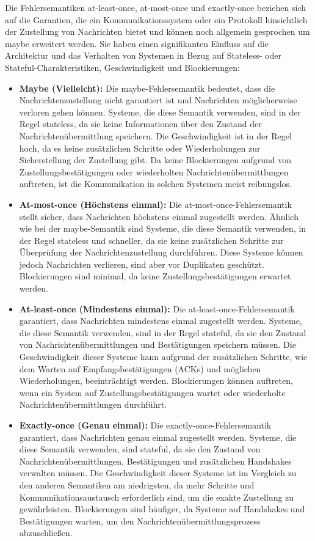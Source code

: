 \documentclass[../vs-script-first-v01.tex]{subfiles}
\begin{document}
Die Fehlersemantiken at-least-once, at-most-once und exactly-once beziehen sich auf die Garantien, die ein Kommunikationssystem oder ein Protokoll hinsichtlich der Zustellung von Nachrichten bietet und können noch allgemein gesprochen um maybe erweitert werden. Sie haben einen signifikanten Einfluss auf die Architektur und das Verhalten von Systemen in Bezug auf Stateless- oder Stateful-Charakteristiken, Geschwindigkeit und Blockierungen:
\begin{itemize}
\item  \textbf{Maybe (Vielleicht):} Die maybe-Fehlersemantik bedeutet, dass die Nachrichtenzustellung nicht garantiert ist und Nachrichten möglicherweise verloren gehen können. Systeme, die diese Semantik verwenden, sind in der Regel stateless, da sie keine Informationen über den Zustand der Nachrichtenübermittlung speichern. Die Geschwindigkeit ist in der Regel hoch, da es keine zusätzlichen Schritte oder Wiederholungen zur Sicherstellung der Zustellung gibt. Da keine Blockierungen aufgrund von Zustellungsbestätigungen oder wiederholten Nachrichtenübermittlungen auftreten, ist die Kommunikation in solchen Systemen meist reibungslos.
\item \textbf{At-most-once (Höchstens einmal):} Die at-most-once-Fehlersemantik stellt sicher, dass Nachrichten höchstens einmal zugestellt werden. Ähnlich wie bei der maybe-Semantik sind Systeme, die diese Semantik verwenden, in der Regel stateless und schneller, da sie keine zusätzlichen Schritte zur Überprüfung der Nachrichtenzustellung durchführen. Diese Systeme können jedoch Nachrichten verlieren, sind aber vor Duplikaten geschützt. Blockierungen sind minimal, da keine Zustellungsbestätigungen erwartet werden.
\item \textbf{At-least-once (Mindestens einmal):} Die at-least-once-Fehlersemantik garantiert, dass Nachrichten mindestens einmal zugestellt werden. Systeme, die diese Semantik verwenden, sind in der Regel stateful, da sie den Zustand von Nachrichtenübermittlungen und Bestätigungen speichern müssen. Die Geschwindigkeit dieser Systeme kann aufgrund der zusätzlichen Schritte, wie dem Warten auf Empfangsbestätigungen (ACKs) und möglichen Wiederholungen, beeinträchtigt werden. Blockierungen können auftreten, wenn ein System auf Zustellungsbestätigungen wartet oder wiederholte Nachrichtenübermittlungen durchführt.
\item \textbf{Exactly-once (Genau einmal):} Die exactly-once-Fehlersemantik garantiert, dass Nachrichten genau einmal zugestellt werden. Systeme, die diese Semantik verwenden, sind stateful, da sie den Zustand von Nachrichtenübermittlungen, Bestätigungen und zusätzlichen Handshakes verwalten müssen. Die Geschwindigkeit dieser Systeme ist im Vergleich zu den anderen Semantiken am niedrigsten, da mehr Schritte und Kommunikationsaustausch erforderlich sind, um die exakte Zustellung zu gewährleisten. Blockierungen sind häufiger, da Systeme auf Handshakes und Bestätigungen warten, um den Nachrichtenübermittlungsprozess abzuschließen.
\end{itemize}
\end{document}
